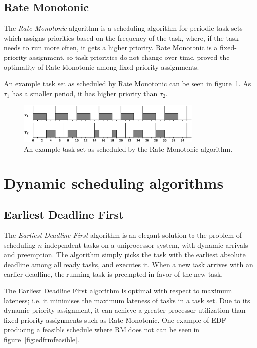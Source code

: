 \documentclass[twoside]{uva-inf-bachelor-thesis}
\begin{document}
\subsection{Rate Monotonic}
The \emph{Rate Monotonic} algorithm is a scheduling algorithm for periodic task sets which assigns priorities based on the frequency of the task, where, if the task needs to run more often, it gets a higher priority. Rate Monotonic is a fixed-priority assignment, so task priorities do not change over time. \textcite{Liu1973} proved the optimality of Rate Monotonic among fixed-priority assignments.

An example task set as scheduled by Rate Monotonic can be seen in figure~\ref{fig:rmexample}. As $\tau_1$ has a smaller period, it has higher priority than $\tau_2$.

\begin{figure}[htpb]
    \centering
    \includegraphics[width=0.8\textwidth]{rmexample.eps}
    \caption{An example task set as scheduled by the Rate Monotonic algorithm.}
    \label{fig:rmexample}
\end{figure}



\section{Dynamic scheduling algorithms}

\subsection{Earliest Deadline First}
The \emph{Earliest Deadline First} algorithm is an elegant solution to the problem of scheduling $n$ independent tasks on a uniprocessor system, with dynamic arrivals and preemption. The algorithm simply picks the task with the earliest absolute deadline among all ready tasks, and executes it. When a new task arrives with an earlier deadline, the running task is preempted in favor of the new task.

The Earliest Deadline First algorithm is optimal with respect to maximum lateness; i.e. it minimises the maximum lateness of tasks in a task set. Due to its dynamic priority assignment, it can achieve a greater processor utilization than fixed-priority assignments such as Rate Monotonic. One example of EDF producing a feasible schedule where RM does not can be seen in figure~\ref{fig:edfrmfeasible}.
\end{document}

